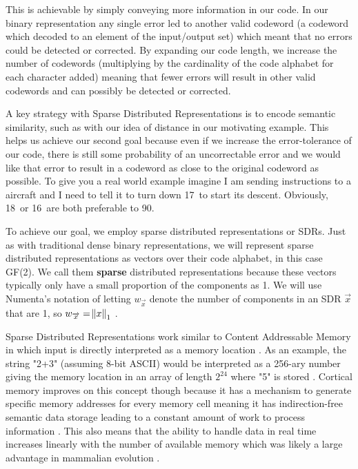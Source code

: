 \documentclass[fleqn,minimal]{article}
\begin{document}
	This is achievable by simply conveying more information in our code. In our binary representation any single error led to another valid codeword (a codeword which decoded to an element of the input/output set) which meant that no errors could be detected or corrected. By expanding our code length, we increase the number of codewords (multiplying by the cardinality of the code alphabet for each character added) meaning that fewer errors will result in other valid codewords and can possibly be detected or corrected. 
	
	A key strategy with Sparse Distributed Representations is to encode semantic similarity, such as with our idea of distance in our motivating example. This helps us achieve our second goal because even if we increase the error-tolerance of our code, there is still some probability of an uncorrectable error and we would like that error to result in a codeword as close to the original codeword as possible. To give you a real world example imagine I am sending instructions to a aircraft and I need to tell it to turn down 17\textdegree \ to start its descent. Obviously, 18\textdegree \ or 16\textdegree \ are both preferable to 90\textdegree.
	
	To achieve our goal, we employ sparse distributed representations or SDRs. Just as with traditional dense binary representations, we will represent sparse distributed representations as vectors over their code alphabet, in this case GF(2). We call them \textbf{sparse} distributed representations because these vectors typically only have a small proportion of the components as 1. We will use Numenta's notation of letting $w_{\overrightarrow{x}}$ denote the number of components in an SDR $\overrightarrow{x}$ that are 1, so $w_{\overrightarrow{x}} = \norm{x}_{1}$ \cite{Properties}.
	
	Sparse Distributed Representations work similar to Content Addressable Memory in which input is directly interpreted as a memory location \cite{Semantic}. As an example, the string "2+3" (assuming 8-bit ASCII) would be interpreted as a 256-ary number giving the memory location in an array of length $2^{24}$ where "5" is stored \cite{Semantic}. Cortical memory improves on this concept though because it has a mechanism to generate specific memory addresses for every memory cell meaning it has indirection-free semantic data storage leading to a constant amount of work to process information \cite{Semantic}. This also means that the ability to handle data in real time increases linearly with the number of available memory which was likely a large advantage in mammalian evolution \cite{Semantic}.
	
\end{document}
